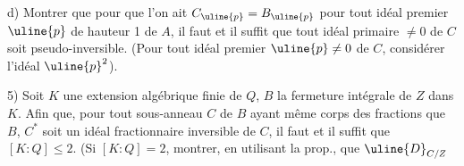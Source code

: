 d) Montrer que pour que l'on ait $C_{\uline{p}}=B_{\uline{p}}$ pour tout idéal premier $\uline{p}$ de hauteur 1 de $A$, il faut et il suffit que tout idéal primaire $\neq0$ de $C$ soit pseudo-inversible. (Pour tout idéal premier $\uline{p}\neq0$ de $C$, considérer l'idéal $\uline{p}^2$).

5) Soit $K$ une extension algébrique finie de $Q$, $B$ la fermeture intégrale de $Z$ dans $K$. Afin que, pour tout sous-anneau $C$ de $B$ ayant même corps des fractions que $B$, $C^*$ soit un idéal fractionnaire inversible de $C$, il faut et il suffit que $[K:Q]\leq2$. (Si $[K:Q]=2$, montrer, en utilisant la prop.\quad, que $\uline{D}_{C/Z}$
